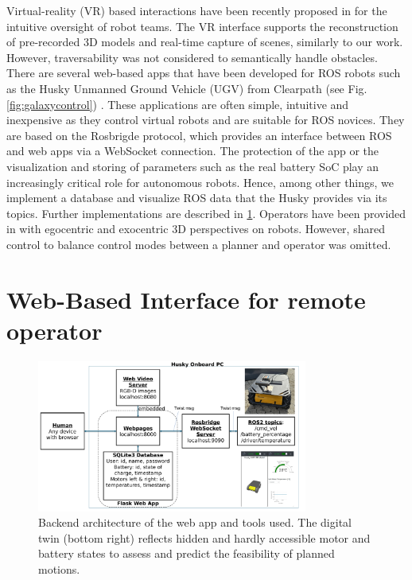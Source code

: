 \documentclass[letterpaper, 10 pt, conference]{ieeeconf}  %
\begin{document}
Virtual-reality (VR) based interactions have been recently proposed in \cite{huang2024evaluation} for the intuitive oversight of robot teams. The VR interface supports the reconstruction of pre-recorded 3D models and real-time capture of scenes, similarly to our work. However,  traversability was not considered to semantically handle obstacles. There are several web-based apps that have been developed for ROS robots such as the Husky Unmanned Ground Vehicle (UGV) from Clearpath (see Fig.\ref{fig:galaxycontrol}) \cite{husky}. These applications are often simple, intuitive and inexpensive as they control virtual robots and are suitable for ROS novices.
They are based on the Rosbrigde protocol, which provides an interface between ROS and web apps via a WebSocket connection\cite{kapic,dinodi,rosbridgeOkState,rosbridgeSuite}.
The protection of the app or the visualization and storing of parameters such as the real battery SoC play an increasingly critical role for autonomous robots.
Hence, among other things, we implement a database and visualize ROS data that the Husky provides via its topics.  Further implementations are described in \ref{sec:framework}.
Operators have been provided in \cite{walker2024cyber} with egocentric and exocentric 3D perspectives on robots. However, shared control to balance control modes between a planner and operator was omitted. 





\section{Web-Based Interface for remote operator}
\label{sec:framework}

\begin{figure}[b]
	\centerline{\includegraphics[width=8.9cm]{images/ROS_Web_App_Architecture.pdf}}
	\caption{Backend architecture of the web app and tools used. The digital twin (bottom right) reflects hidden and hardly accessible motor and battery states to assess and predict the feasibility of planned motions.}
	\label{fig:userapp}
\end{figure}
\end{document}
